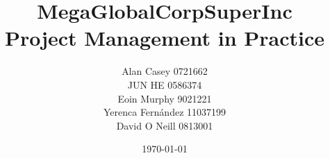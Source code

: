 \documentclass[11pt,a4paper]{report}
\begin{document}
	
	
\title{MegaGlobalCorpSuperInc\\ Project Management in Practice}
\author{Alan Casey 0721662\\
JUN HE       0586374\\
Eoin Murphy 9021221\\
Yerenca Fernández 11037199\\
David O Neill  0813001}
\date{\today}

\begin{titlepage}
\maketitle
\end{titlepage}

\thispagestyle{empty}
\pagestyle{empty}

%

\thispagestyle{empty}
\tableofcontents
\thispagestyle{empty}
\pagestyle{plain}












 \label{listoffig}
\nocite{*}
{\small
\cleardoublepage
}


\listoffigures
{}
\end{document}

